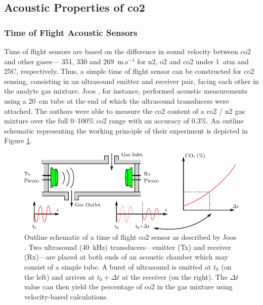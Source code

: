 
\subsection{Acoustic Properties of \texorpdfstring{\gls{co2}}{CO2}}\label{subsect:choos:review:acoustic}

\subsubsection{Time of Flight Acoustic Sensors}\label{subsect:choos:review:tof}

Time of flight sensors are based on the difference in sound velocity between \gls{co2} and other gases---\eg{} 351, 330 and 269~m.s$^{-1}$ for \gls{n2}, \gls{o2} and \gls{co2} under 1~atm and 25{\degree}C, respectively\cite{giacobbe1993}. Thus, a simple time of flight sensor can be constructed for \gls{co2} sensing, consisting in an ultrasound emitter and receiver pair, facing each other in the analyte gas mixture. Joos \etal{}\cite{joos1993}, for instance, performed acoustic measurements using a 20~cm tube at the end of which the ultrasound transducers were attached. The authors were able to measure the \gls{co2} content of a \gls{co2} / \gls{n2} gas mixture over the full 0--100\% \gls{co2} range with an accuracy of 0.3\%. An outline schematic representing the working principle of their experiment is depicted in Figure \ref{fig:choos:review:time_of_flight}.

\begin{figure}
	\centering
	\includegraphics{1_main_matter/choos_figures/review/time_of_flight}
	\caption[Outline schematic of a time of flight \gls{co2} sensor.]{Outline schematic of a time of flight \gls{co2} sensor as described by Joos \etal{}\cite{joos1993}. Two ultrasound (40~kHz) transducers---emitter (Tx) and receiver (Rx)---are placed at both ends of an acoustic chamber which may consist of a simple tube. A burst of ultrasound is emitted at $t_0$ (on the left) and arrives at $t_0+{\Delta}t$ at the receiver (on the right). The ${\Delta}t$ value can then yield the percentage of \gls{co2} in the gas mixture using velocity-based calculations.}
	\label{fig:choos:review:time_of_flight}
\end{figure}

